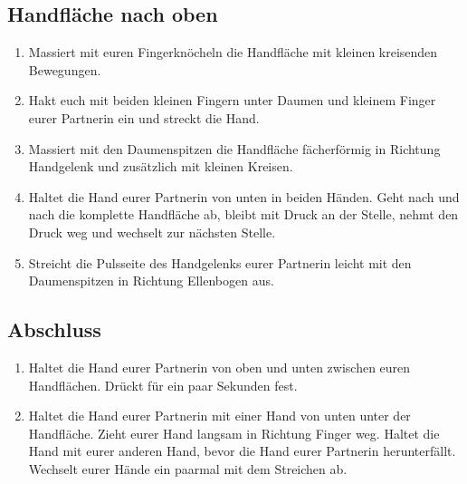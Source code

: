 \subsection{Handfläche nach oben}
\begin{enumerate}
	\item {} Massiert mit euren Fingerknöcheln die Handfläche mit kleinen kreisenden Bewegungen.
	\item {} Hakt euch mit beiden kleinen Fingern unter Daumen und kleinem Finger eurer Partnerin ein und streckt die Hand.
	\item {} Massiert mit den Daumenspitzen die Handfläche fächerförmig in Richtung Handgelenk und zusätzlich mit kleinen Kreisen.
	\item {} Haltet die Hand eurer Partnerin von unten in beiden Händen. Geht nach und nach die komplette Handfläche ab, bleibt mit Druck an der Stelle, nehmt den Druck weg und wechselt zur nächsten Stelle.
	\item {} Streicht die Pulsseite des Handgelenks eurer Partnerin leicht mit den Daumenspitzen in Richtung Ellenbogen aus.
\end{enumerate}

\subsection{Abschluss}
\begin{enumerate}
	\item {} Haltet die Hand eurer Partnerin von oben und unten zwischen euren Handflächen. Drückt für ein paar Sekunden fest.
	\item {} Haltet die Hand eurer Partnerin mit einer Hand von unten unter der Handfläche. Zieht eurer Hand langsam in Richtung Finger weg. Haltet die Hand mit eurer anderen Hand, bevor die Hand eurer Partnerin herunterfällt. Wechselt eurer Hände ein paarmal mit dem Streichen ab.
\end{enumerate}
